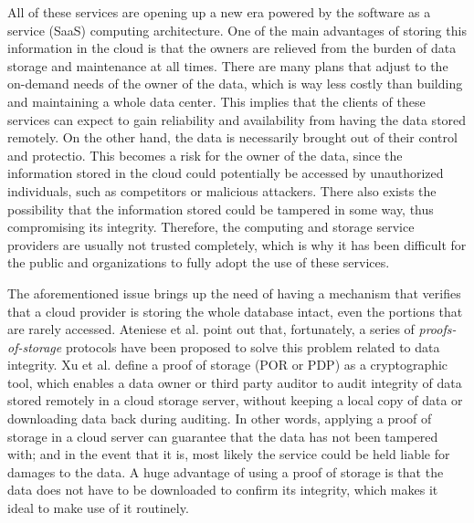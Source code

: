 All of these services are opening up a new era powered by the software as a service (SaaS) computing architecture. One of the main advantages of storing this information in the cloud is that the owners are relieved from the burden of data storage and maintenance at all times. There are many plans that adjust to the on-demand needs of the owner of the data, which is way less costly than building and maintaining a whole data center. This implies that the clients of these services can expect to gain reliability and availability from having the data stored remotely. On the other hand, the data is necessarily brought out of their control and protectio. This becomes a risk for the owner of the data, since the information stored in the cloud could potentially be accessed by unauthorized individuals, such as competitors or malicious attackers. There also exists the possibility that the information stored could be tampered in some way, thus compromising its integrity. Therefore, the computing and storage service providers are usually not trusted completely, which is why it has been difficult for the public and organizations to fully adopt the use of these services.

The aforementioned issue brings up the need of having a mechanism that verifies that a cloud provider is storing the whole database intact, even the portions that are rarely accessed. Ateniese et al. \cite{cryptoeprint:2014:886} point out that, fortunately, a series of \textit{proofs-of-storage} protocols have been proposed to solve this problem related to data integrity. Xu et al. \cite{cryptoeprint:2014:395} define a proof of storage (POR or PDP) as a cryptographic tool, which enables a data owner or third party auditor to audit integrity of data stored remotely in a cloud storage server, without keeping a local copy of data or downloading data back during auditing. In other words, applying a proof of storage in a cloud server can guarantee that the data has not been tampered with; and in the event that it is, most likely the service could be held liable for damages to the data. A huge advantage of using a proof of storage is that the data does not have to be downloaded to confirm its integrity, which makes it ideal to make use of it routinely. 

